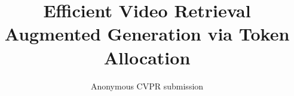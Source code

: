 \documentclass[10pt,twocolumn,letterpaper]{article}
\title{Efficient Video Retrieval Augmented Generation via Token Allocation}
\author{Anonymous CVPR submission}
\begin{document}

{
    \small
    
    
}
\end{document}

